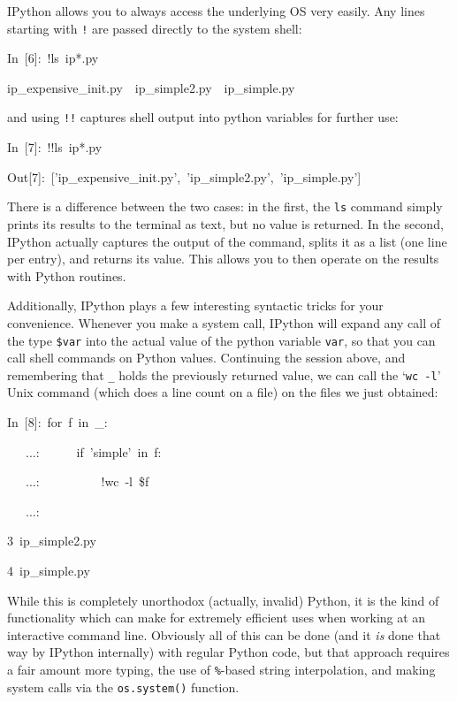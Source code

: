 IPython allows you to always access the underlying OS very easily.
Any lines starting with \texttt{!} are passed directly to the system
shell:

\begin{lyxcode}
In~{[}6]:~!ls~ip{*}.py

ip\_expensive\_init.py~~ip\_simple2.py~~ip\_simple.py
\end{lyxcode}
and using \texttt{!!} captures shell output into python variables
for further use:

\begin{lyxcode}
In~{[}7]:~!!ls~ip{*}.py

Out{[}7]:~{[}'ip\_expensive\_init.py',~'ip\_simple2.py',~'ip\_simple.py']
\end{lyxcode}
There is a difference between the two cases: in the first, the \texttt{ls}
command simply prints its results to the terminal as text, but no
value is returned. In the second, IPython actually captures the output
of the command, splits it as a list (one line per entry), and returns
its value. This allows you to then operate on the results with Python
routines.

Additionally, IPython plays a few interesting syntactic tricks for
your convenience. Whenever you make a system call, IPython will expand
any call of the type \texttt{\$var} into the actual value of the python
variable \texttt{var}, so that you can call shell commands on Python
values. Continuing the session above, and remembering that \texttt{\_}
holds the previously returned value, we can call the `\texttt{wc -l}'
Unix command (which does a line count on a file) on the files we just
obtained:

\begin{lyxcode}
In~{[}8]:~for~f~in~\_:

~~~...:~~~~~~if~'simple'~in~f:

~~~...:~~~~~~~~~~!wc~-l~\$f

~~~...:

3~ip\_simple2.py

4~ip\_simple.py
\end{lyxcode}
While this is completely unorthodox (actually, invalid) Python, it
is the kind of functionality which can make for extremely efficient
uses when working at an interactive command line. Obviously all of
this can be done (and it \emph{is} done that way by IPython internally)
with regular Python code, but that approach requires a fair amount
more typing, the use of \texttt{\%}-based string interpolation, and
making system calls via the \texttt{os.system()} function.

